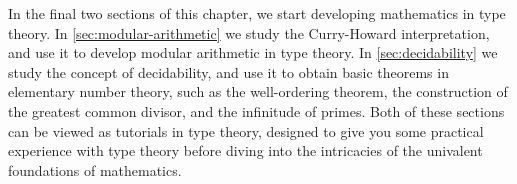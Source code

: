 In the final two sections of this chapter, we start developing mathematics in type theory. In \cref{sec:modular-arithmetic} we study the Curry-Howard interpretation, and use it to develop modular arithmetic in type theory. In \cref{sec:decidability} we study the concept of decidability, and use it to obtain basic theorems in elementary number theory, such as the well-ordering theorem, the construction of the greatest common divisor, and the infinitude of primes. Both of these sections can be viewed as tutorials in type theory, designed to give you some practical experience with type theory before diving into the intricacies of the univalent foundations of mathematics.









%

\cleardoublepage

